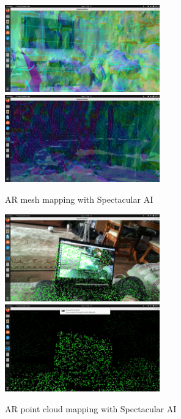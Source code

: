 \begin{figure}[H]
	\centering
	\includegraphics[width=67mm, keepaspectratio]{figures/spectacular_ai_mapping_ar_mesh1.png}\hspace{1cm}
	\includegraphics[width=67mm, keepaspectratio]{figures/spectacular_ai_mapping_ar_mesh2.png}\\\vspace{5mm}
	\caption{AR mesh mapping with Spectacular AI}
    \label{fig:SPAI_mesh_mapping}
\end{figure}

\begin{figure}[H]
	\centering
	\includegraphics[width=67mm, keepaspectratio]{figures/spectacular_ai_mapping_ar_pc1.png}\hspace{1cm}
	\includegraphics[width=67mm, keepaspectratio]{figures/spectacular_ai_mapping_ar_pc2.png}\\\vspace{5mm}
	\caption{AR point cloud mapping with Spectacular AI}
    \label{fig:SPAI_point_cloud_mapping}
\end{figure}

